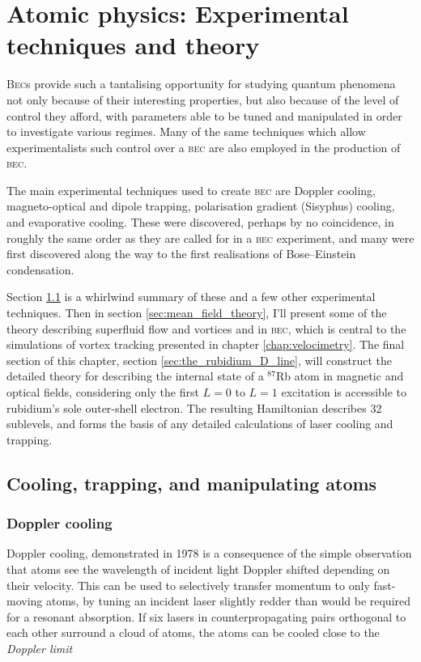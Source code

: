 \chapter{Atomic physics: Experimental techniques and theory}\label{chap:atomic_physics}

\textsc{Bec}s provide such a tantalising opportunity for studying quantum phenomena not only because of their interesting properties, but also because of the level of control they afford, with parameters able to be tuned and manipulated in order to investigate various regimes. Many of the same techniques which allow experimentalists such control over a \textsc{bec} are also employed in the production of \textsc{bec}.

The main experimental techniques used to create \textsc{bec} are Doppler cooling, magneto-optical and dipole trapping, polarisation gradient (Sisyphus) cooling, and evaporative cooling. These were discovered, perhaps by no coincidence, in roughly the same order as they are called for in a \textsc{bec} experiment, and many were first discovered along the way to the first realisations of Bose--Einstein condensation.

Section \ref{sec:cooling_and_trapping} is a whirlwind summary of these and a few other experimental techniques. Then in section \ref{sec:mean_field_theory}, I'll present some of the theory describing superfluid flow and vortices and in \textsc{bec}, which is central to the simulations of vortex tracking presented in chapter \ref{chap:velocimetry}. The final section of this chapter, section \ref{sec:the_rubidium_D_line}, will construct the detailed theory for describing the internal state of a $^{87}$Rb atom in magnetic and optical fields, considering only the first $L=0$ to $L=1$ excitation is accessible to rubidium's  sole outer-shell electron. The resulting Hamiltonian describes 32 sublevels, and forms the basis of any detailed calculations of laser cooling and trapping.

\section{Cooling, trapping, and manipulating atoms}\label{sec:cooling_and_trapping}

\subsection{Doppler cooling}

Doppler cooling, demonstrated in 1978 \cite{wineland_radiation-pressure_1978} is a consequence of the simple observation that atoms see the wavelength of incident light Doppler shifted depending on their velocity. This can be used to selectively transfer momentum to only fast-moving atoms, by tuning an incident laser slightly redder than would be required for a resonant absorption. If six lasers in counterpropagating pairs orthogonal to each other surround a cloud of atoms, the atoms can be cooled close to the \emph{Doppler limit} \cite[p 58]{metcalf_laser_1999}

